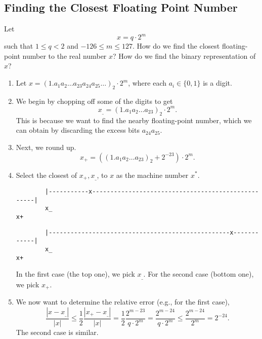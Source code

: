 \documentclass[letterpaper]{article}
\begin{document}
\subsection{Finding the Closest Floating Point Number}
Let \[x = q \cdot 2^m\] such that $1 \leq q < 2$ and $-126 \leq m \leq 127$. How do we find the closest floating-point number to the real number $x$? How do we find the binary representation of $x$? 
\begin{enumerate}
    \item Let $x = (1.a_1 a_2 \hdots a_{23} a_{24} a_{25} \hdots)_{2} \cdot 2^{m}$, where each $a_i \in \{0, 1\}$ is a digit.
    
    \item We begin by chopping off some of the digits to get 
    \[x_{\_} = (1.a_{1} a_{2} \hdots a_{23})_2 \cdot 2^m.\]
    This is because we want to find the nearby floating-point number, which we can obtain by discarding the excess bits $a_{24}a_{25}$. 

    \item Next, we round up. 
    \[x_{+} = ((1.a_1 a_2 \hdots a_{23})_2 + 2^{-23}) \cdot 2^m.\]

    \item Select the closest of $x_{+}, x_{\_}$, to $x$ as the machine number $x^*$.
    \begin{verbatim}
        |-----------x---------------------------------------------------|
        x_                                                              x+\end{verbatim}
    \begin{verbatim}
        |--------------------------------------------------x------------|
        x_                                                              x+\end{verbatim}
    In the first case (the top one), we pick $x_\_$. For the second case (bottom one), we pick $x_+$. 

    \item We now want to determine the relative error (e.g., for the first case),
    \[\frac{|x - x_\_|}{|x|} \leq \frac{1}{2} \frac{|x_+ - x_\_|}{|x|} = \frac{1}{2} \frac{2^{m - 23}}{q \cdot 2^m} = \frac{2^{m - 24}}{q \cdot 2^m} \leq \frac{2^{m - 24}}{2^m} = 2^{-24}.\]
    The second case is similar.
\end{enumerate}
\end{document}
